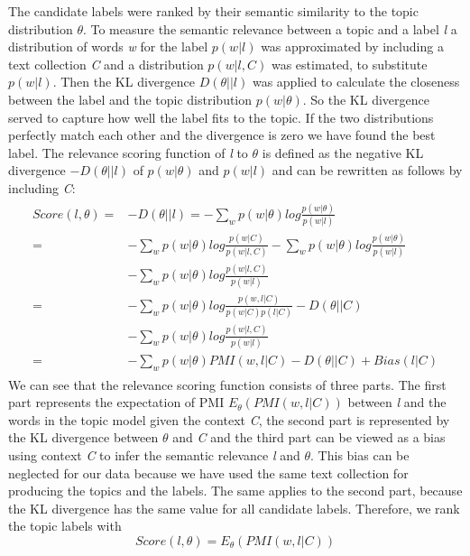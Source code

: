 The candidate labels were ranked by their semantic similarity to the topic distribution $\theta$. To measure the semantic relevance between a topic and a label \textit{l} a distribution of words \textit{w} for the label $p(w|l)$ was approximated by including a text collection \textit{C} and a distribution $p(w|l,C)$ was estimated, to substitute $p(w|l)$. Then the \ac{KL} divergence $D(\theta||l)$ was applied to calculate the closeness between the label and the topic distribution $p(w|\theta)$. So the \ac{KL} divergence served to capture how well the label fits to the topic. If the two distributions perfectly match each other and the divergence is zero we have found the best label. 
The relevance scoring function of \textit{l}  to $\theta$ is defined as the negative \ac{KL} divergence $-D(\theta||l)$ of $p(w|\theta)$ and $p(w|l)$ and can be rewritten as follows by including \textit{C}:
\begin{align}
\begin{split}
	Score(l,\theta) = &-D(\theta||l) =
	-\sum_{w} p(w|\theta)log\frac{p(w|\theta)}{p(w|l)}\\ =
	&-\sum_{w} p(w|\theta)log\frac{p(w|C)}{p(w|l,C)} -\sum_{w} p(w|\theta)log\frac{p(w|\theta)}{p(w|l)}\\ &-\sum_{w} p(w|\theta)log\frac{p(w|l,C)}{p(w|l)} \\ =
	&-\sum_{w} p(w|\theta)log\frac{p(w,l|C)}{p(w|C) p(l|C)} -D(\theta||C)\\ &-\sum_{w} p(w|\theta)log\frac{p(w|l,C)}{p(w|l)}\\  =
	&-\sum_{w} p(w|\theta) PMI(w,l|C)-D(\theta||C) + Bias(l|C) 
\end{split}
\end{align}
We can see that the relevance scoring function consists of three parts. The first part represents the expectation of \ac{PMI} $E_{\theta}(PMI(w,l|C))$ between \textit{l} and the words in the topic model given the context \textit{C}, the second part is represented by the \ac{KL} divergence between $\theta$ and \textit{C} and the third part can be viewed as a bias using context
\textit{C} to infer the semantic relevance \textit{l} and $\theta$. This bias can be neglected for our data because we have used the same text collection for  producing the topics and the labels. The same applies to the second part, because the \ac{KL} divergence has the same value for all candidate labels. Therefore, we rank the topic labels with 
\begin{equation}
Score(l,\theta) = E_{\theta}(PMI(w,l|C))
\label{Mei:Scoring}
\end{equation}

